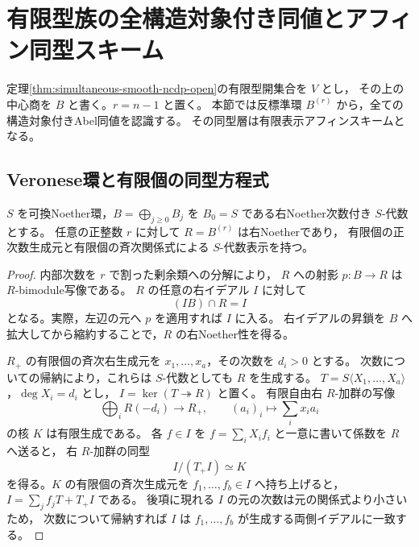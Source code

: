 \section{有限型族の全構造対象付き同値とアフィン同型スキーム}
\label{sec:finite-full-equivalences}

定理\ref{thm:simultaneous-smooth-ncdp-open}の有限型開集合を $V$ とし，
その上の中心商を $B$ と書く。$r=n-1$ と置く。
本節では反標準環 $B^{(r)}$ から，全ての構造対象付きAbel同値を認識する。
その同型層は有限表示アフィンスキームとなる。

\subsection{Veronese環と有限個の同型方程式}

\begin{lemma}\label{lem:veronese-finite-presentation}
$S$ を可換Noether環，$B=\bigoplus_{j\ge0}B_j$ を
$B_0=S$ である右Noether次数付き $S$-代数とする。
任意の正整数 $r$ に対して $R=B^{(r)}$ は右Noetherであり，
有限個の正次数生成元と有限個の斉次関係式による $S$-代数表示を持つ。
\end{lemma}
\begin{proof}
内部次数を $r$ で割った剰余類への分解により，
$R$ への射影 $p:B\to R$ は $R$-bimodule写像である。
$R$ の任意の右イデアル $I$ に対して
\[
  (IB)\cap R=I
\]
となる。実際，左辺の元へ $p$ を適用すれば $I$ に入る。
右イデアルの昇鎖を $B$ へ拡大してから縮約することで，$R$ の右Noether性を得る。

$R_+$ の有限個の斉次右生成元を $x_1,\ldots,x_a$，その次数を $d_i>0$ とする。
次数についての帰納により，これらは $S$-代数としても $R$ を生成する。
$T=S\langle X_1,\ldots,X_a\rangle$，$\deg X_i=d_i$ とし，
$I=\ker(T\twoheadrightarrow R)$ と置く。
有限自由右 $R$-加群の写像
\[
  \bigoplus_i R(-d_i)\longrightarrow R_+,
  \qquad (a_i)_i\longmapsto\sum_i x_i a_i
\]
の核 $K$ は有限生成である。
各 $f\in I$ を $f=\sum_i X_i f_i$ と一意に書いて係数を $R$ へ送ると，
右 $R$-加群の同型
\[
  I/(T_+I)\simeq K
\]
を得る。$K$ の有限個の斉次生成元を $f_1,\ldots,f_b\in I$ へ持ち上げると，
$I=\sum_j f_jT+T_+I$ である。
後項に現れる $I$ の元の次数は元の関係式より小さいため，
次数について帰納すれば $I$ は $f_1,\ldots,f_b$ が生成する両側イデアルに一致する。
\end{proof}

